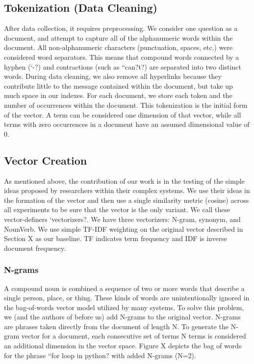 \documentclass{acm_proc_article-sp}
\begin{document}
\subsection{Tokenization (Data Cleaning)}
After data collection, it requires preprocessing. We consider one question as a document, and attempt to capture all of the alphanumeric words within the document. All non-alphanumeric characters (punctuation, spaces, etc.) were considered word separators. This means that compound words connected by a hyphen (`-?) and contractions (such as ``can?t?) are separated into two distinct words. During data cleaning, we also remove all hyperlinks because they contribute little to the message contained within the document, but take up much space in our indexes. For each document, we store each token and the number of occurrences within the document. This tokenization is the initial form of the vector. A term can be considered one dimension of that vector, while all terms with zero occurrences in a document have an assumed dimensional value of 0.


\subsection{Vector Creation}
As mentioned above, the contribution of our work is in the testing of the simple ideas proposed by researchers within their complex systems. We use their ideas in the formation of the vector and then use a single similarity metric (cosine) across all experiments to be sure that the vector is the only variant. We call these vector-definers `vectorizers?. We have three vectorizers: N-gram, synonym, and NounVerb. We use simple TF-IDF weighting on the original vector described in Section X as our baseline. TF indicates term frequency and IDF is inverse document frequency. 

\subsubsection{N-grams}
A compound noun is combined a sequence of two or more words that describe a single person, place, or thing. These kinds of words are unintentionally ignored in the bag-of-words vector model utilized by many systems. To solve this problem, we (and the authors of \cite{millar2006performance} before us) add N-grams to the original vector. N-grams are phrases taken directly from the document of length N.  To generate the N-gram vector for a document, each consecutive set of terms N terms is considered an additional dimension in the vector space. Figure X depicts the bag of words for the phrase ``for loop in python? with added N-grams (N=2).
\end{document}
